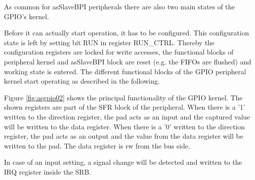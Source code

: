 As common for asSlaveBPI peripherals there are also two main states of the GPIO’s kernel.

Before it can actually start operation, it has to be configured. This configuration state is left by setting bit RUN in register RUN\_CTRL. Thereby the configuration registers are locked for write accesses, the functional blocks of peripheral kernel and asSlaveBPI block are reset (e.g. the FIFOs are flushed) and working state is entered. The different functional blocks of the GPIO peripheral kernel start operating as described in the following.

Figure \ref{fig:asgpio02} shows the principal functionality of the GPIO kernel. The shown registers are part of the SFR block of the peripheral. When there is a '1' written to the direction register, the pad acts as an input and the captured value will be written to the data register. When there is a '0' written to the direction register, the pad acts as an output and the value from the data register will be written to the pad. The data register is rw from the bus side. 

In case of an input setting, a signal change will be detected and written to the IRQ register inside the SRB.